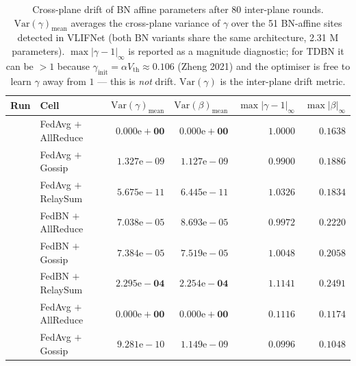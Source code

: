 %

\begin{table}[t]
\centering
\caption{Cross-plane drift of BN affine parameters after 80 inter-plane
rounds. $\mathrm{Var}(\gamma)_{\text{mean}}$ averages the cross-plane
variance of $\gamma$ over the 51 BN-affine sites detected in VLIFNet
(both BN variants share the same architecture, 2.31 M parameters).
$\max|\gamma\!-\!1|_\infty$ is reported as a magnitude diagnostic;
for TDBN it can be $> 1$ because $\gamma_{\text{init}} = \alpha
V_{\text{th}} \approx 0.106$ (Zheng 2021) and the optimiser is free
to learn $\gamma$ away from $1$ — this is \emph{not} drift.
$\mathrm{Var}(\gamma)$ is the inter-plane drift metric.}
\label{tab:drift_v2}
\renewcommand{\arraystretch}{1.10}
\setlength{\tabcolsep}{4.5pt}
\begin{tabular}{l l r r r r}
\toprule
Run & Cell & $\mathrm{Var}(\gamma)_{\text{mean}}$ & $\mathrm{Var}(\beta)_{\text{mean}}$ & $\max|\gamma\!-\!1|_\infty$ & $\max|\beta|_\infty$ \\
\midrule
{}
  & FedAvg $+$ AllReduce  & $\mathbf{0.000\mathrm{e}{+}00}$ & $\mathbf{0.000\mathrm{e}{+}00}$ & $1.0000$ & $0.1638$ \\
  & FedAvg $+$ Gossip     & $1.327\mathrm{e}{-}09$ & $1.127\mathrm{e}{-}09$ & $0.9900$ & $0.1886$ \\
  & FedAvg $+$ RelaySum   & $5.675\mathrm{e}{-}11$ & $6.445\mathrm{e}{-}11$ & $1.0326$ & $0.1834$ \\
  & FedBN  $+$ AllReduce  & $7.038\mathrm{e}{-}05$ & $8.693\mathrm{e}{-}05$ & $0.9972$ & $0.2220$ \\
  & FedBN  $+$ Gossip     & $7.384\mathrm{e}{-}05$ & $7.519\mathrm{e}{-}05$ & $1.0048$ & $0.2058$ \\
  & FedBN  $+$ RelaySum   & $\mathbf{2.295\mathrm{e}{-}04}$ & $\mathbf{2.254\mathrm{e}{-}04}$ & $1.1141$ & $0.2491$ \\
\midrule
{}
  & FedAvg $+$ AllReduce  & $\mathbf{0.000\mathrm{e}{+}00}$ & $\mathbf{0.000\mathrm{e}{+}00}$ & $0.1116$ & $0.1174$ \\
  & FedAvg $+$ Gossip     & $9.281\mathrm{e}{-}10$ & $1.149\mathrm{e}{-}09$ & $0.0996$ & $0.1048$ \\

\end{tabular}
\end{table}
